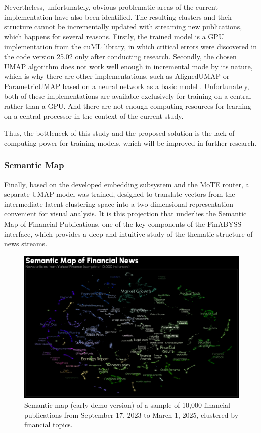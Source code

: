 Nevertheless, unfortunately, obvious problematic areas of the current implementation have also been
identified. The resulting clusters and their structure cannot be incrementally updated with streaming
new publications, which happens for several reasons. Firstly, the trained model is a GPU implementation
from the cuML library, in which critical errors were discovered in the code version 25.02
\parencite{cuml2020machine} only after conducting research. Secondly, the chosen UMAP algorithm
does not work well enough in incremental mode by its nature, which is why there are other implementations,
such as AlignedUMAP \parencite{mcinnes2018umap-software} or ParametricUMAP based on a neural network
as a basic model \parencite{ParametricUMAP2020}. Unfortunately, both of these implementations are available
exclusively for training on a central rather than a GPU. And there are not enough computing resources
for learning on a central processor in the context of the current study.

Thus, the bottleneck of this study and the proposed solution is the lack of computing power for training
models, which will be improved in further research.

\subsubsection{Semantic Map}

Finally, based on the developed embedding subsystem and the MoTE router, a separate UMAP model was trained,
designed to translate vectors from the intermediate latent clustering space into a two-dimensional
representation convenient for visual analysis. It is this projection that underlies the Semantic Map
of Financial Publications, one of the key components of the FinABYSS interface, which provides a deep
and intuitive study of the thematic structure of news streams.

\begin{figure}[H]
    \centering
    \includegraphics[width=1\linewidth]{img/semantic_map.png}
    \caption{Semantic map (early demo version) of a sample of 10,000 financial publications
    from September 17, 2023 to March 1, 2025, clustered by financial topics.}
    \label{fig:semantic_map}
\end{figure}

